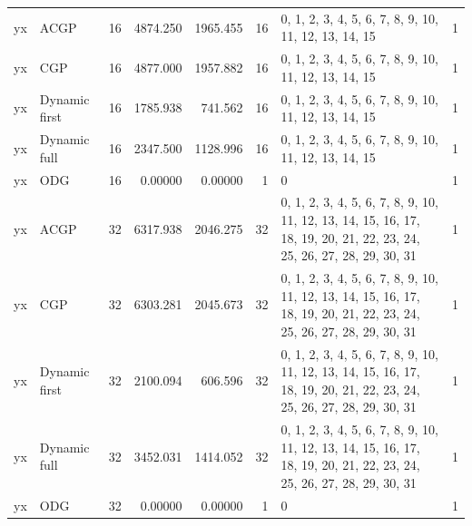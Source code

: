 \documentclass[10pt,a4paper]{article}
\begin{document}
\begin{longtable}{@{}p{23mm}p{29mm}rrrrp{36mm}r@{}}
yx & ACGP & 16 & 4874.250 & 1965.455 & 16 & 0, 1, 2, 3, 4, 5, 6, 7, 8, 9, 10, 11, 12, 13, 14, 15 & 1 \\
yx & CGP & 16 & 4877.000 & 1957.882 & 16 & 0, 1, 2, 3, 4, 5, 6, 7, 8, 9, 10, 11, 12, 13, 14, 15 & 1 \\
yx & Dynamic first & 16 & 1785.938 & 741.562 & 16 & 0, 1, 2, 3, 4, 5, 6, 7, 8, 9, 10, 11, 12, 13, 14, 15 & 1 \\
yx & Dynamic full & 16 & 2347.500 & 1128.996 & 16 & 0, 1, 2, 3, 4, 5, 6, 7, 8, 9, 10, 11, 12, 13, 14, 15 & 1 \\
yx & ODG & 16 & 0.00000 & 0.00000 & 1 & 0 & 1 \\
yx & ACGP & 32 & 6317.938 & 2046.275 & 32 & 0, 1, 2, 3, 4, 5, 6, 7, 8, 9, 10, 11, 12, 13, 14, 15, 16, 17, 18, 19, 20, 21, 22, 23, 24, 25, 26, 27, 28, 29, 30, 31 & 1 \\
yx & CGP & 32 & 6303.281 & 2045.673 & 32 & 0, 1, 2, 3, 4, 5, 6, 7, 8, 9, 10, 11, 12, 13, 14, 15, 16, 17, 18, 19, 20, 21, 22, 23, 24, 25, 26, 27, 28, 29, 30, 31 & 1 \\
yx & Dynamic first & 32 & 2100.094 & 606.596 & 32 & 0, 1, 2, 3, 4, 5, 6, 7, 8, 9, 10, 11, 12, 13, 14, 15, 16, 17, 18, 19, 20, 21, 22, 23, 24, 25, 26, 27, 28, 29, 30, 31 & 1 \\
yx & Dynamic full & 32 & 3452.031 & 1414.052 & 32 & 0, 1, 2, 3, 4, 5, 6, 7, 8, 9, 10, 11, 12, 13, 14, 15, 16, 17, 18, 19, 20, 21, 22, 23, 24, 25, 26, 27, 28, 29, 30, 31 & 1 \\
yx & ODG & 32 & 0.00000 & 0.00000 & 1 & 0 & 1 \\
\end{longtable}\normalsize\setlength{\tabcolsep}{6pt}
\clearpage
\end{document}
